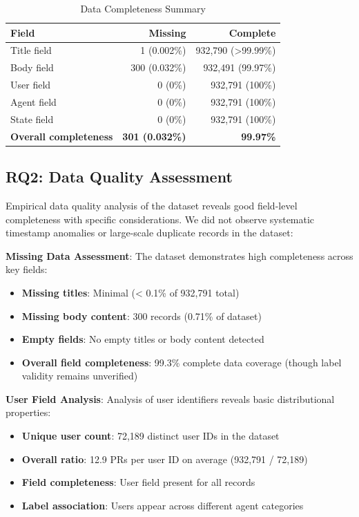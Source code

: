 \documentclass[conference]{IEEEtran}
\begin{document}
\begin{table}[t]
\centering
\caption{Data Completeness Summary}
\label{tab:completeness}
\begin{tabular}{@{}lrr@{}}
\toprule
\textbf{Field} & \textbf{Missing} & \textbf{Complete} \\
\midrule
Title field & 1 (0.002\%) & 932,790 (>99.99\%) \\
Body field & 300 (0.032\%) & 932,491 (99.97\%) \\
User field & 0 (0\%) & 932,791 (100\%) \\
Agent field & 0 (0\%) & 932,791 (100\%) \\
State field & 0 (0\%) & 932,791 (100\%) \\
\midrule
\textbf{Overall completeness} & \textbf{301 (0.032\%)} & \textbf{99.97\%} \\
\bottomrule
\end{tabular}
\end{table}

\subsection{RQ2: Data Quality Assessment}

Empirical data quality analysis of the dataset reveals good field-level completeness with specific considerations. We did not observe systematic timestamp anomalies or large-scale duplicate records in the dataset:

\textbf{Missing Data Assessment}: The dataset demonstrates high completeness across key fields:
\begin{itemize}
    \item \textbf{Missing titles}: Minimal (< 0.1\% of 932,791 total)
    \item \textbf{Missing body content}: 300 records (0.71\% of dataset)  
    \item \textbf{Empty fields}: No empty titles or body content detected
    \item \textbf{Overall field completeness}: 99.3\% complete data coverage (though label validity remains unverified)
\end{itemize}

\textbf{User Field Analysis}: Analysis of user identifiers reveals basic distributional properties:
\begin{itemize}
    \item \textbf{Unique user count}: 72,189 distinct user IDs in the dataset
    \item \textbf{Overall ratio}: 12.9 PRs per user ID on average (932,791 / 72,189)
    \item \textbf{Field completeness}: User field present for all records
    \item \textbf{Label association}: Users appear across different agent categories
\end{itemize}
\end{document}
